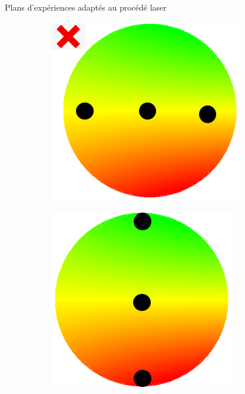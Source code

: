 \documentclass[10pt]{beamer}
\begin{document}
\begin{frame} 
\begin{block}{Plans d'expériences adaptés au procédé laser}
\begin{figure}[H] 
\begin{subfigure}[l]{0.2\textwidth}
\centering
\includegraphics[width=\textwidth, height=\textwidth]{figures/doe2.png}
\label{fige}
\end{subfigure}%
\hspace{0.05\textwidth}
\begin{subfigure}[l]{0.2\textwidth}
\centering 
\includegraphics[width=\textwidth, height=\textwidth]{figures/doe3.png}

\end{subfigure}
\end{figure}
\end{block}
\end{frame}
\end{document}
